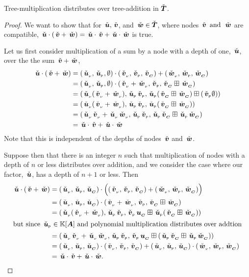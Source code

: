 \begin{proposition}\label{TMdistrib}
  Tree-multiplication distributes over tree-addition in $\DOMR$.
  \begin{proof}
    We want to show that for $\rnode{u}, \rnode{v}$, and $\rnode{w} \in
    \DOMR$, where nodes $\rnode{v} \mand \rnode{w}$ are compatible, 
    $\rnode{u}\tdot(\rnode{v}+\rnode{w}) = \rnode{u}\tdot\rnode{v}+\rnode{u}\tdot\rnode{w}$
    is true.
  
    Let us first consider multiplication of a sum by a node with a depth of one, $\rnode{u}$,
    over the the sum $\rnode{v}+\rnode{w}$,
    \begin{align*}
      \rnode{u}\tdot(\rnode{v}+\rnode{w}) &=
      \Node{\rv{u}}{\rlabel{u}}{\emptyset}\tdot\SNode{v}+\SNode{w}\\
      &=\Node{\rv{u}}{\rlabel{u}}{\emptyset}\tdot\Node{\rv{v}+\rv{w}}{\rlabel{v}}{\rchild{v}\stplus\rchild{w}}\\
      &=\Node{\rv{u}(\rv{v} + \rv{w})}{\rlabel{u}\rlabel{v}}{\rlabel{u}(\rchild{v}\stplus\rchild{w})\stplus(\rlabel{v}\emptyset)}\\
      &=\Node{\rv{u}(\rv{v} + \rv{w})}{\rlabel{u}\rlabel{v}}{\rlabel{u}(\rchild{v}\stplus\rchild{w})}\\
      &=\Node{\rv{u}\rv{v} + \rv{u}\rv{w}}{\rlabel{u}\rlabel{v}}{\rlabel{u}\rchild{v}\stplus\rlabel{u}\rchild{w}}\\
      &=\rnode{u}\tdot\rnode{v} + \rnode{u}\tdot\rnode{w}
    \end{align*}
    Note that this is independent of the depths of nodes $\rnode{v}$ and $\rnode{w}$.

    Suppose then that there is an integer $n$ such that multiplication
    of nodes with a depth of $n$ or less distributes over
    addition, and we consider the case where our factor, $\rnode{u}$, has 
    a depth of $n+1$ or less. Then
    \begin{align*}
      \rnode{u}\tdot(\rnode{v}+\rnode{w})&=\SNode{u}\tdot\Bigl(\SNode{v}+\SNode{w}\Bigr)\\
      &=\SNode{u}\tdot\Node{\rv{v}+\rv{w}}{\rlabel{v}}{\rchild{v}\stplus\rchild{w}}\\
      &=\Node{\rv{u}(\rv{v}+\rv{w})}{\rlabel{u}\rlabel{v}}{\rlabel{v}\child{u}\stplus\rlabel{u}(\rchild{v}\stplus\rchild{w})}\\
      \intertext{but since $\rlabel{u}\in\PLY{A}$ and polynomial multiplication distributes over addtion}
      &=\Node{\rv{u}\rv{v}+\rv{u}\rv{w}}{\rlabel{u}\rlabel{v}}{\rlabel{v}\child{u}\stplus(\rlabel{u}\rchild{v}\stplus\rlabel{u}\rchild{w})}\\
      &=\SNode{u}\tdot\SNode{v} + \SNode{u}\tdot\SNode{w}\\
      &=\rnode{u}\tdot\rnode{v}+\rnode{u}\tdot\rnode{w}.
    \end{align*}
\end{proof}
\end{proposition}





